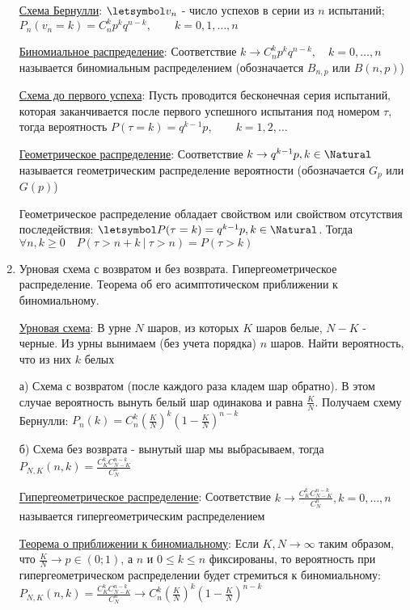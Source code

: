 \begin{enumerate}
    \hyperlink{bernoullischema2}{Схема Бернулли}: $\letsymbol v_n$ - число успехов в серии из $n$ испытаний; 
    $P_n(v_n = k) = C^k_n p^k q^{n - k}, \quad\quad k = 0, 1, \dots, n$

    \hyperlink{binomialdistribution}{Биномиальное распределение}: Соответствие $k \rightarrow C^k_n p^k q^{n - k}, \quad k = 0, \dots, n$ называется биномиальным распределением
    (обозначается $B_{n,p}$ или $B(n, p)$)

    \hyperlink{untilfirstsuccessschema}{Схема до первого успеха}: Пусть проводится бесконечная серия испытаний, которая заканчивается после первого успешного испытания
    под номером $\tau$, тогда вероятность $P(\tau = k) = q^{k - 1} p, \quad\quad k = 1, 2, \dots$

    \hyperlink{geometricdistribution}{Геометрическое распределение}: Соответствие $k \rightarrow q^{k - 1} p, k \in \Natural$ называется геометрическим
    распределение вероятности (обозначается $G_p$ или $G(p)$)

    Геометрическое распределение обладает свойством  или свойством отсутствия
    последействия: \Ths $\letsymbol P(\tau = k) = q^{k - 1} p, k \in \Natural$. Тогда $\forall n, k \geq 0 \quad P(\tau > n + k \ | \ \tau > n) = P(\tau > k)$

    \item Урновая схема с возвратом и без возврата. Гипергеометрическое распределение. Теорема об его асимптотическом приближении к биномиальному.

    \hyperlink{urnschema}{Урновая схема}: В урне $N$ шаров, из которых $K$ шаров белые, $N - K$ - черные.
    Из урны вынимаем (без учета порядка) $n$ шаров. Найти вероятность, что из них $k$ белых

    а) Схема с возвратом (после каждого раза кладем шар обратно). В этом случае вероятность вынуть белый шар одинакова и
    равна $\frac{K}{N}$. Получаем схему Бернулли: $P_n(k) = C^k_n \left(\frac{K}{N}\right)^k \left(1 - \frac{K}{N}\right)^{n - k}$

    б) Схема без возврата - вынутый шар мы выбрасываем, тогда
    $P_{N, K} (n, k) = \frac{C^k_K C^{n - k}_{N - K}}{C^n_N}$

    \hyperlink{hypergeometricdistribution}{Гипергеометрическое распределение}: Соответствие $k \rightarrow \frac{C^k_K C^{n - k}_{N - K}}{C^n_N}, k = 0, \dots, n$ называется гипергеометрическим
    распределением

    \hyperlink{hypergeometricasimptotic}{Теорема о приближении к биномиальному}: \Ths Если $K, N \to \infty$ таким образом, что $\frac{K}{N} \to p \in (0;1)$, а $n$ и $0 \leq k \leq n$ фиксированы, то
    вероятность при гипергеометрическом распределении будет стремиться к биномиальному:
    $P_{N,K} (n, k) = \frac{C^k_K C^{n - k}_{N - K}}{C^n_N} \rightarrow C^k_n \left(\frac{K}{N}\right)^k \left(1 - \frac{K}{N}\right)^{n - k}$


\end{enumerate}

